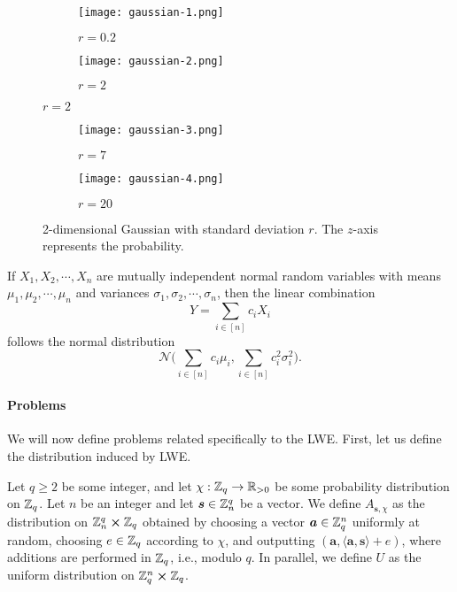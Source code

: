 \begin{figure}[ht]
        \centering
		\begin{subfigure}{.5\linewidth} 
                \centering
                \texttt{[image: gaussian-1.png]}
                \caption{$r = 0.2$}
        \end{subfigure}%
        \begin{subfigure}{.5\linewidth}
                \centering
                \texttt{[image: gaussian-2.png]}
                \caption{$r = 2$}
        \end{subfigure}
\end{figure}

\begin{figure}[h]
        \centering
		\begin{subfigure}{.5\linewidth} 
                \centering
                \texttt{[image: gaussian-3.png]}
                \caption{$r = 7$}
        \end{subfigure}%
        \begin{subfigure}{.5\linewidth}
                \centering
                \texttt{[image: gaussian-4.png]}
                \caption{$r = 20$}
        \end{subfigure}
        \caption{2-dimensional Gaussian with standard deviation $r$. The $z$-axis represents the probability.}
        \label{smoothing-1}
\end{figure}
\begin{proposition}\label{gauss_sum}
If $X_1, X_2, \cdots, X_n$ are mutually independent normal random variables with means $\mu_1, \mu_2, \cdots, \mu_n$ and variances $\sigma_1, \sigma_2, \cdots, \sigma_n$, then the linear combination
\[ Y = \sum_{i \in [n]} c_i X_i \]
follows the normal distribution
\[ \mathcal{N}\biggl(\sum_{i \in [n]} c_i \mu_i, \sum_{i \in [n]} c^2_i \sigma^2_i\biggr). \]
\end{proposition}
\paragraph{Problems}
We will now define problems related specifically to the LWE. First, let us define the distribution induced by LWE. 
\begin{definition}\label{lwe-distr}
	Let $q \geq 2$ be some integer, and let $\chi : \mathbb{Z}_q \rightarrow \mathbb{R}_{>0}$ be some probability distribution on $\mathbb{Z}_q$. Let $n$ be an integer and let $\boldsymbol{s} \in \mathbb{Z}_n^q$ be a vector. We define $A_{\bm{s},\chi}$ as the distribution on $\mathbb{Z}_n^q \cross \mathbb{Z}_q$ obtained by choosing a vector $\boldsymbol{a} \in \mathbb{Z}_q^n$ uniformly at random, choosing $e \in \mathbb{Z}_q$ according to $\chi$, and outputting $(\bm{a}, \langle \bm{a}, \bm{s} \rangle + e)$, where additions are performed in $\mathbb{Z}_q$, i.e., modulo $q$. In parallel, we define $U$ as the uniform distribution on $\mathbb{Z}_q^n \cross \mathbb{Z}_q$.
\end{definition}


